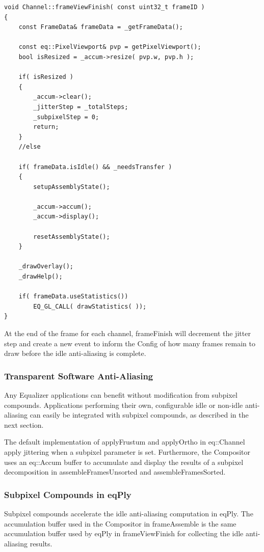 \documentclass[10pt,a4]{scrartcl}
\begin{document}
{\footnotesize\begin{lstlisting}
void Channel::frameViewFinish( const uint32_t frameID )
{
    const FrameData& frameData = _getFrameData();

    const eq::PixelViewport& pvp = getPixelViewport();
    bool isResized = _accum->resize( pvp.w, pvp.h );

    if( isResized )
    {
        _accum->clear();
        _jitterStep = _totalSteps;
        _subpixelStep = 0;
        return;
    }
    //else

    if( frameData.isIdle() && _needsTransfer )
    {
        setupAssemblyState();

        _accum->accum();
        _accum->display();

        resetAssemblyState();
    }

    _drawOverlay();
    _drawHelp();

    if( frameData.useStatistics())
        EQ_GL_CALL( drawStatistics( ));
}
\end{lstlisting}}

At the end of the frame for each channel, \textsf{frameFinish} will decrement
the jitter step and create a new event to inform the \textsf{Config} of how many
frames remain to draw before the idle anti-aliasing is complete.

\subsubsection{Transparent Software Anti-Aliasing}

Any Equalizer applications can benefit without modification from subpixel
compounds. Applications performing their own, configurable idle or non-idle
anti-aliasing can easily be integrated with subpixel compounds, as described in
the next section.

The default implementation of \textsf{applyFrustum} and \textsf{applyOrtho} in
\textsf{eq::Channel} apply jittering when a subpixel parameter is set.
Furthermore, the \textsf{Compositor} uses an \textsf{eq::Accum} buffer to
accumulate and display the results of a subpixel decomposition in \textsf{assembleFramesUnsorted} and \textsf{assembleFramesSorted}.


\subsubsection{Subpixel Compounds in eqPly}

Subpixel compounds accelerate the idle anti-aliasing computation in eqPly. The
accumulation buffer used in the \textsf{Compositor} in \textsf{frameAssemble} is
the same accumulation buffer used by eqPly in \textsf{frameViewFinish} for
collecting the idle anti-aliasing results.
\end{document}
